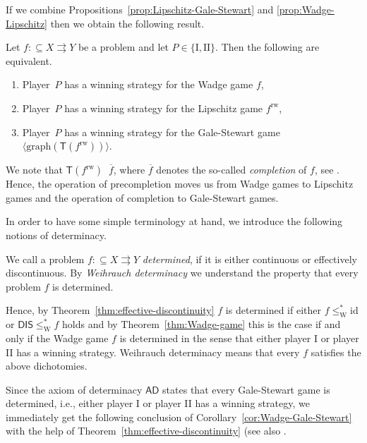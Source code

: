 \documentclass{amsart}
\def\In{\subseteq}
\def\mto{\rightrightarrows}
\def\T{{\mathsf{{T}}}}
\def\equivSW{\mathop{\equiv_{\mathrm{sW}}}}
\def\equivSW{\mathop{\equiv_{\mathrm{sW}}}}
\def\id{{\mathrm{id}}}
\def\graph{{\mathrm{graph}}}
\def\DIS{\mathsf{DIS}}
\def\AD{\mathsf{AD}}
\begin{document}
If we combine Propositions~\ref{prop:Lipschitz-Gale-Stewart} and \ref{prop:Wadge-Lipschitz} then we obtain the following
result.

\begin{corollary}
\label{cor:Wadge-Gale-Stewart}
Let $f:\In X\mto Y$ be a problem and let $P\in\{\mathrm{I, II}\}$. Then the following are equivalent.
\begin{enumerate}
\item Player~$P$ has a winning strategy for the Wadge game $f$,
\item Player~$P$ has a winning strategy for the Lipschitz game $f^\mathrm{rw}$,
\item Player~$P$ has a winning strategy for the Gale-Stewart game $\langle\graph(\T(f^\mathrm{rw}))\rangle$.
\end{enumerate}
\end{corollary}

We note that $\T(f^\mathrm{rw})\equivSW\overline{f}$, where $\overline{f}$ denotes the so-called {\em completion} of $f$, see \cite[Lemma~4.9]{BG21a}.
Hence, the operation of precompletion moves us from Wadge games to Lipschitz games and the operation of completion to Gale-Stewart games. 

In order to have some simple terminology at hand, we introduce the following notions of determinacy.

\begin{definition}[Determinacy]
We call a problem $f:\In X\mto Y$ {\em determined}, if it is either continuous or effectively discontinuous.
By {\em Weihrauch determinacy} we understand the property that every problem $f$ is determined.
\end{definition}

Hence, by Theorem~\ref{thm:effective-discontinuity} $f$ is determined if either $f\leq_\mathrm{W}^*\id$ or $\DIS\leq_\mathrm{W}^* f$ holds and
by Theorem~\ref{thm:Wadge-game} this is the case if and only if the Wadge game $f$ is determined in the sense that either player I or player II has a winning strategy.
Weihrauch determinacy means that every $f$ satisfies the above dichotomies. 

Since the axiom of determinacy $\AD$ states that every Gale-Stewart game is determined, i.e., either player I or player II has a winning strategy,
we immediately get the following conclusion of Corollary~\ref{cor:Wadge-Gale-Stewart}
with the help of Theorem~\ref{thm:effective-discontinuity} (see also \cite[Corollary~3.7]{NP19}.
\end{document}
